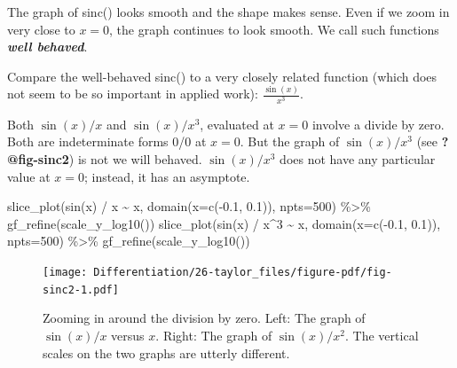 \documentclass[
  letterpaper,
  DIV=11,
  numbers=noendperiod,
  oneside]{scrreprt}
\newenvironment{Shaded}{\begin{snugshade}}{\end{snugshade}}
\newcommand{\AttributeTok}[1]{\textcolor[rgb]{0.40,0.46,0.14}{#1}}
\newcommand{\DecValTok}[1]{\textcolor[rgb]{0.68,0.00,0.00}{#1}}
\newcommand{\FloatTok}[1]{\textcolor[rgb]{0.68,0.00,0.00}{#1}}
\newcommand{\FunctionTok}[1]{\textcolor[rgb]{0.28,0.35,0.67}{#1}}
\newcommand{\NormalTok}[1]{\textcolor[rgb]{0.00,0.46,0.62}{#1}}
\newcommand{\SpecialCharTok}[1]{\textcolor[rgb]{0.37,0.37,0.37}{#1}}
\begin{document}
The graph of sinc() looks smooth and the shape makes sense. Even if we
zoom in very close to \(x=0\), the graph continues to look smooth. We
call such functions \textbf{\emph{well behaved}}.

Compare the well-behaved sinc() to a very closely related function
(which does not seem to be so important in applied work):
\(\frac{\sin(x)}{x^3}\).

Both \(\sin(x)/x\) and \(\sin(x) / x^3\), evaluated at \(x=0\) involve a
divide by zero. Both are indeterminate forms 0/0 at \(x=0\). But the
graph of \(\sin(x) / x^3\) (see \textbf{?@fig-sinc2}) is not we will
behaved. \(\sin(x) / x^3\) does not have any particular value at
\(x=0\); instead, it has an asymptote.

\begin{Shaded}
\begin{Highlighting}[]
\FunctionTok{slice\_plot}\NormalTok{(}\FunctionTok{sin}\NormalTok{(x) }\SpecialCharTok{/}\NormalTok{ x }\SpecialCharTok{\textasciitilde{}}\NormalTok{ x, }\FunctionTok{domain}\NormalTok{(}\AttributeTok{x=}\FunctionTok{c}\NormalTok{(}\SpecialCharTok{{-}}\FloatTok{0.1}\NormalTok{, }\FloatTok{0.1}\NormalTok{)), }\AttributeTok{npts=}\DecValTok{500}\NormalTok{) }\SpecialCharTok{\%\textgreater{}\%}
  \FunctionTok{gf\_refine}\NormalTok{(}\FunctionTok{scale\_y\_log10}\NormalTok{())}
\FunctionTok{slice\_plot}\NormalTok{(}\FunctionTok{sin}\NormalTok{(x) }\SpecialCharTok{/}\NormalTok{ x}\SpecialCharTok{\^{}}\DecValTok{3} \SpecialCharTok{\textasciitilde{}}\NormalTok{ x, }\FunctionTok{domain}\NormalTok{(}\AttributeTok{x=}\FunctionTok{c}\NormalTok{(}\SpecialCharTok{{-}}\FloatTok{0.1}\NormalTok{, }\FloatTok{0.1}\NormalTok{)), }\AttributeTok{npts=}\DecValTok{500}\NormalTok{) }\SpecialCharTok{\%\textgreater{}\%}
  \FunctionTok{gf\_refine}\NormalTok{(}\FunctionTok{scale\_y\_log10}\NormalTok{())}
\end{Highlighting}
\end{Shaded}

\begin{figure}[H]

{\centering \texttt{[image: Differentiation/26-taylor\_files/figure-pdf/fig-sinc2-1.pdf]}

}

\caption{\label{fig-sinc2-1}Zooming in around the division by zero.
Left: The graph of \(\sin(x)/x\) versus \(x\). Right: The graph of
\(\sin(x)/x^2\). The vertical scales on the two graphs are utterly
different.}

\end{figure}
\end{document}
